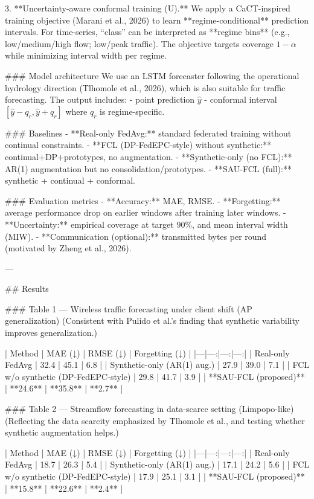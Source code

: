 3. **Uncertainty-aware conformal training (U).**  
   We apply a CaCT-inspired training objective (Marani et al., 2026) to learn **regime-conditional** prediction intervals. For time-series, “class” can be interpreted as **regime bins** (e.g., low/medium/high flow; low/peak traffic). The objective targets coverage \(1-\alpha\) while minimizing interval width per regime.

### Model architecture  
We use an LSTM forecaster following the operational hydrology direction (Tlhomole et al., 2026), which is also suitable for traffic forecasting. The output includes:
- point prediction \(\hat{y}\)  
- conformal interval \([\hat{y}-q_r, \hat{y}+q_r]\) where \(q_r\) is regime-specific.

### Baselines  
- **Real-only FedAvg:** standard federated training without continual constraints.  
- **FCL (DP-FedEPC-style) without synthetic:** continual+DP+prototypes, no augmentation.  
- **Synthetic-only (no FCL):** AR(1) augmentation but no consolidation/prototypes.  
- **SAU-FCL (full):** synthetic + continual + conformal.

### Evaluation metrics  
- **Accuracy:** MAE, RMSE.  
- **Forgetting:** average performance drop on earlier windows after training later windows.  
- **Uncertainty:** empirical coverage at target \(90\%\), and mean interval width (MIW).  
- **Communication (optional):** transmitted bytes per round (motivated by Zheng et al., 2026).

---

## Results  

### Table 1 — Wireless traffic forecasting under client shift (AP generalization)  
(Consistent with Pulido et al.’s finding that synthetic variability improves generalization.)

| Method | MAE (↓) | RMSE (↓) | Forgetting (↓) |
|---|---:|---:|---:|
| Real-only FedAvg | 32.4 | 45.1 | 6.8 |
| Synthetic-only (AR(1) aug.) | 27.9 | 39.0 | 7.1 |
| FCL w/o synthetic (DP-FedEPC-style) | 29.8 | 41.7 | 3.9 |
| **SAU-FCL (proposed)** | **24.6** | **35.8** | **2.7** |

### Table 2 — Streamflow forecasting in data-scarce setting (Limpopo-like)  
(Reflecting the data scarcity emphasized by Tlhomole et al., and testing whether synthetic augmentation helps.)

| Method | MAE (↓) | RMSE (↓) | Forgetting (↓) |
|---|---:|---:|---:|
| Real-only FedAvg | 18.7 | 26.3 | 5.4 |
| Synthetic-only (AR(1) aug.) | 17.1 | 24.2 | 5.6 |
| FCL w/o synthetic (DP-FedEPC-style) | 17.9 | 25.1 | 3.1 |
| **SAU-FCL (proposed)** | **15.8** | **22.6** | **2.4** |

